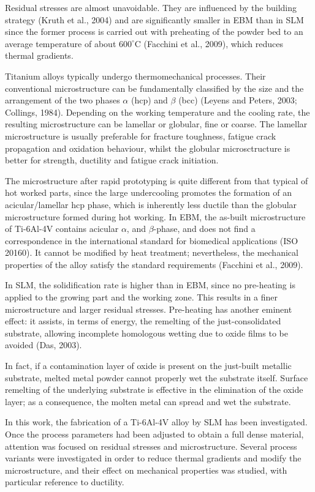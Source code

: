 \documentclass[10pt]{article}
\begin{document}
Residual stresses are almost unavoidable. They are influenced by the building strategy (Kruth et al., 2004) and are significantly smaller in EBM than in SLM since the former process is carried out with preheating of the powder bed to an average temperature of about $600^{\circ} \mathrm{C}$ (Facchini et al., 2009), which reduces thermal gradients.

Titanium alloys typically undergo thermomechanical processes. Their conventional microstructure can be fundamentally classified by the size and the arrangement of the two phases $\alpha$ (hcp) and $\beta$ (bcc) (Leyens and Peters, 2003; Collings, 1984). Depending on the working temperature and the cooling rate, the resulting microstructure can be lamellar or globular, fine or coarse. The lamellar microstructure is usually preferable for fracture toughness, fatigue crack propagation and oxidation behaviour, whilst the globular microsctructure is better for strength, ductility and fatigue crack initiation.

The microstructure after rapid prototyping is quite different from that typical of hot worked parts, since the large undercooling promotes the formation of an acicular/lamellar hcp phase, which is inherently less ductile than the globular microstructure formed during hot working. In EBM, the as-built microstructure of Ti-6Al-4V contains acicular $\alpha$, and $\beta$-phase, and does not find a correspondence in the international standard for biomedical applications (ISO 20160). It cannot be modified by heat treatment; nevertheless, the mechanical properties of the alloy satisfy the standard requirements (Facchini et al., 2009).

In SLM, the solidification rate is higher than in EBM, since no pre-heating is applied to the growing part and the working zone. This results in a finer microstructure and larger residual stresses. Pre-heating has another eminent effect: it assists, in terms of energy, the remelting of the just-consolidated substrate, allowing incomplete homologous wetting due to oxide films to be avoided (Das, 2003).

In fact, if a contamination layer of oxide is present on the just-built metallic substrate, melted metal powder cannot properly wet the substrate itself. Surface remelting of the underlying substrate is effective in the elimination of the oxide layer; as a consequence, the molten metal can spread and wet the substrate.

In this work, the fabrication of a Ti-6Al-4V alloy by SLM has been investigated. Once the process parameters had been adjusted to obtain a full dense material, attention was focused on residual stresses and microstructure. Several process variants were investigated in order to reduce thermal gradients and modify the microstructure, and their effect on mechanical properties was studied, with particular reference to ductility.
\end{document}
